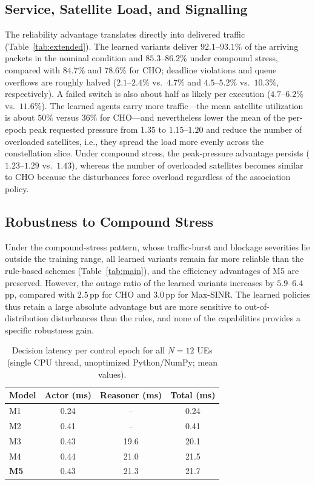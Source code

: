 \documentclass[journal]{IEEEtran}
\begin{document}
\subsection{Service, Satellite Load, and Signalling}
The reliability advantage translates directly into delivered traffic
(Table~\ref{tab:extended}). The learned variants
deliver $92.1$--$93.1\%$ of the arriving packets in the nominal condition and
$85.3$--$86.2\%$ under compound stress, compared with $84.7\%$ and $78.6\%$ for
CHO; deadline violations and queue overflows are roughly halved
($2.1$--$2.4\%$ vs.\ $4.7\%$ and $4.5$--$5.2\%$ vs.\ $10.3\%$, respectively).
A failed switch is also about half as likely per execution ($4.7$--$6.2\%$
vs.\ $11.6\%$). The learned agents carry more traffic---the mean satellite
utilization is about $50\%$ versus $36\%$ for CHO---and nevertheless lower the mean of the per-epoch peak requested pressure
from $1.35$ to $1.15$--$1.20$ and reduce the number of overloaded satellites, i.e., they
spread the load more evenly across the constellation slice. Under compound
stress, the peak-pressure advantage persists ($1.23$--$1.29$ vs.\ $1.43$),
whereas the number of overloaded satellites becomes similar to CHO because the
disturbances force overload regardless of the association policy.

\subsection{Robustness to Compound Stress}
Under the compound-stress pattern, whose traffic-burst and blockage
severities lie outside the training range, all learned variants remain far
more reliable than the rule-based schemes (Table~\ref{tab:main}), and the
efficiency advantages of M5 are preserved. However, the outage ratio of the
learned variants increases by $5.9$--$6.4$\,pp, compared with $2.5$\,pp for CHO
and $3.0$\,pp for Max-SINR. The learned policies thus retain a large absolute
advantage but are more sensitive to out-of-distribution disturbances than the
rules, and none of the capabilities provides a specific robustness gain.

\begin{table}[t]
\centering
\caption{Decision latency per control epoch for all $N=12$ UEs (single CPU thread, unoptimized Python/NumPy; mean values).}
\label{tab:latency}
\footnotesize
\setlength{\tabcolsep}{3pt}
\begin{tabular}{@{}lccc@{}}
\toprule
Model & Actor (ms) & Reasoner (ms) & Total (ms)\\
\midrule
M1 & 0.24 & -- & 0.24\\
M2 & 0.41 & -- & 0.41\\
M3 & 0.43 & 19.6 & 20.1\\
M4 & 0.44 & 21.0 & 21.5\\
\textbf{M5} & 0.43 & 21.3 & 21.7\\
\bottomrule
\end{tabular}
\end{table}
\end{document}
